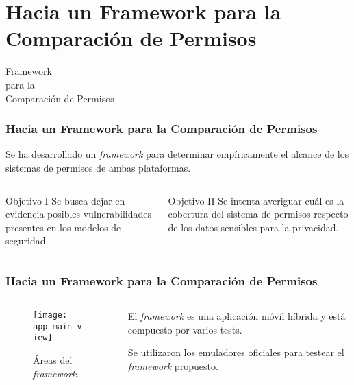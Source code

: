 \section{Hacia un Framework para la Comparación de Permisos}
\begin{frame}
 \begin{center}
  \LARGE Framework \\para la \\Comparación de Permisos
 \end{center}
\end{frame}
\begin{frame}
 \frametitle{Hacia un Framework para la Comparación de Permisos}
 \begin{block}{}
Se ha desarrollado un \textit{framework} para determinar empíricamente el alcance de los sistemas de permisos de ambas plataformas.
 \end{block}\pause
 \begin{columns}
  \begin{column}[]{.45\textwidth}
   \begin{exampleblock}{Objetivo I}
    {Se busca dejar en evidencia posibles vulnerabilidades presentes en los modelos de seguridad.}
   \end{exampleblock}
  \end{column}
  \begin{column}[]{.53\textwidth}\pause
   \begin{exampleblock}{Objetivo II}
    {Se intenta averiguar cuál es la cobertura del sistema de permisos respecto de los datos sensibles para la privacidad.}
   \end{exampleblock}
  \end{column}
 \end{columns}
\end{frame}
\begin{frame}
 \frametitle{Hacia un Framework para la Comparación de Permisos}
 \begin{columns}
  \begin{column}[]{.4\textwidth}
    \begin{figure}[hbtp]
     \centering
	 \texttt{[image: app\_main\_view]}
	 \caption{Áreas del \textit{framework}.}
	 \label{fig:chapter05:main_view}
    \end{figure}
  \end{column}
  \begin{column}[]{.58\textwidth}
  \begin{block}{}
El \textit{framework} es una aplicación móvil híbrida  \pause y está compuesto por varios tests.
   \end{block}\pause
   \begin{block}{}
Se utilizaron los emuladores oficiales para testear el \emph{framework} propuesto.
    \end{block}
  \end{column}
 \end{columns}
\end{frame}

